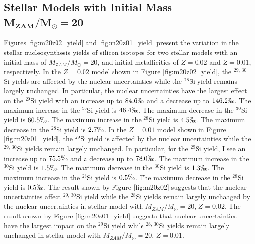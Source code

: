 \documentclass{brandeis-thesis3.2}
\def \msun {M_{\odot}}
\newcommand{\iso}[2]{$^{#1}${#2}}
\begin{document}
\subsection[Stellar Models with Initial Mass $M_{ZAM}/\msun = 20$]{Stellar Models with Initial Mass $\mathbf{M_{ZAM}/\msun = 20}$}

Figures \ref{fig:m20z02_yield} and \ref{fig:m20z01_yield} present the variation in the stellar nucleosynthesis yields of silicon isotopes for two stellar models with an initial mass of $M_{ZAM}/\msun =20$, and initial metallicities of $Z=0.02$ and $Z=0.01$, respectively. In the $Z=0.02$ model shown in Figure \ref{fig:m20z02_yield}, the \iso{29, \, 30}{Si} yields are affected by the nuclear uncertainties while the \iso{28}{Si} yield remains largely unchanged. In particular, the nuclear uncertainties have the largest effect on the \iso{29}{Si} yield with an increase up to $84.6\permil$ and a decrease up to $146.2\permil$. The maximum increase in the \iso{30}{Si} yield is $46.4\permil$. The maximum decrease in the \iso{30}{Si} yield is $60.5\permil$. The maximum increase in the \iso{28}{Si} yield is $4.5\permil$. The maximum decrease in the \iso{28}{Si} yield is $2.7\permil$. In the $Z=0.01$ model shown in Figure \ref{fig:m20z01_yield}, the \iso{29}{Si} yield is affected by the nuclear uncertainties while the \iso{29, \, 30}{Si} yields remain largely unchanged. In particular, for the \iso{29}{Si} yield, I see an increase up to $75.5\permil$ and a decrease up to $78.0\permil$. The maximum increase in the \iso{30}{Si} yield is $1.5\permil$. The maximum decrease in the \iso{30}{Si} yield is $1.3\permil$. The maximum increase in the \iso{28}{Si} yield is $0.5\permil$. The maximum decrease in the \iso{28}{Si} yield is $0.5\permil$. The result shown by Figure \ref{fig:m20z02} suggests that the nuclear uncertainties affect \iso{29,\, 30}{Si} yield while the \iso{28}{Si} yields remain largely unchanged by the nuclear uncertainties in stellar model with $M_{ZAM}/\msun =20$, $Z=0.02$. The result shown by Figure \ref{fig:m20z01_yield} suggests that nuclear uncertainties have the largest impact on the \iso{29}{Si} yield while \iso{28,\, 30}{Si} yields remain largely unchanged in stellar model with $M_{ZAM}/\msun =20$, $Z=0.01$.
\end{document}

